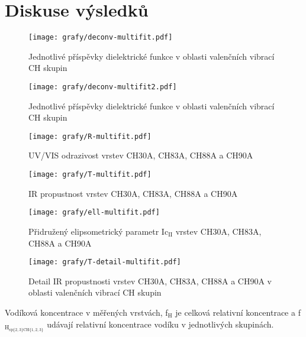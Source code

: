 \chapter{Diskuse výsledků}

\begin{figure}[ht]
	\texttt{[image: grafy/deconv-multifit.pdf]}
	\caption{Jednotlivé příspěvky dielektrické funkce v oblasti valenčních vibrací CH skupin}
\end{figure}

\begin{figure}[ht]
	\texttt{[image: grafy/deconv-multifit2.pdf]}
	\caption{Jednotlivé příspěvky dielektrické funkce v oblasti valenčních vibrací CH skupin}
\end{figure}

\begin{figure}[ht]
	\texttt{[image: grafy/R-multifit.pdf]}
	\caption{UV/VIS odrazivost vrstev CH30A, CH83A, CH88A a CH90A}
\end{figure}

\begin{figure}[ht]
	\texttt{[image: grafy/T-multifit.pdf]}
	\caption{IR propustnost vrstev CH30A, CH83A, CH88A a CH90A}
\end{figure}

\begin{figure}[ht]
	\texttt{[image: grafy/ell-multifit.pdf]}
	\caption{Přidružený elipsometrický parametr Ic$_{\mathrm{II}}$ vrstev CH30A, CH83A, CH88A a CH90A}
\end{figure}

\begin{figure}[ht]
	\texttt{[image: grafy/T-detail-multifit.pdf]}
	\caption{Detail IR propustnosti vrstev CH30A, CH83A, CH88A a CH90A v oblasti valenčních vibrací CH skupin}
\end{figure}

\begin{table}[htbp]
 \centering
 
 \caption{Vodíková koncentrace v měřených vrstvách, f$_\mathrm{H}$ je celková relativní koncentrace a f$_\mathrm{H_{sp\{2,3\}CH\{1,2,3\}}}$ udávají relativní koncentrace vodíku v jednotlivých skupinách.}
\label{deppodminky}
\end{table}

\cleardoublepage
